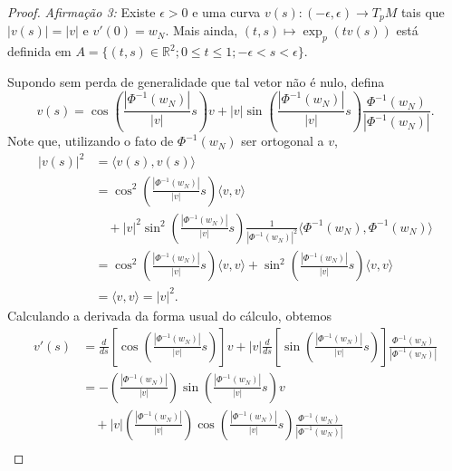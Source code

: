 \begin{theorem}
\begin{proof}
        \emph{Afirmação 3:} Existe $\epsilon>0$ e uma curva $v(s):(-\epsilon,\epsilon)\to T_{p}M$ tais que $|v(s)|=|v|$ e $v'(0)=w_{N}$. Mais ainda, $(t,s) \mapsto \exp_{p}(tv(s))$ está definida em $A=\{ (t,s) \in \mathbb{R}^{2}; 0\leq t\leq1; -\epsilon<s<\epsilon \}$.

        Supondo sem perda de generalidade que tal vetor não é nulo, defina
        \begin{equation*}
            v(s)=\cos\left( \frac{|\Phi ^{-1}(w_{N})|}{|v|}s \right)v+|v|\sin\left( \frac{|\Phi ^{-1}(w_{N})|}{|v|}s \right)\frac{\Phi ^{-1}(w_{N})}{|\Phi ^{-1}(w_{N})|}.
        \end{equation*}
        Note que, utilizando o fato de $\Phi ^{-1}(w_{N})$ ser ortogonal a $v$,
        \begin{align*}
            |v(s)|^{2} & =\langle v(s),v(s) \rangle                                                                                                                                 \\
                       & =\cos ^{2}\left(\frac{|\Phi ^{-1}(w_{N})|}{|v|}s \right)\langle v,v \rangle                                                                                \\
                       & \quad + |v|^{2}\sin^{2}\left( \frac{|\Phi ^{-1}(w_{N})|}{|v|}s \right)\frac{1}{|\Phi ^{-1}(w_{N})|^{2}}\langle \Phi ^{-1}(w_{N}), \Phi ^{-1}(w_{N})\rangle \\
                       & =\cos ^{2}\left(\frac{|\Phi ^{-1}(w_{N})|}{|v|}s \right)\langle v,v \rangle + \sin^{2}\left( \frac{|\Phi ^{-1}(w_{N})|}{|v|}s \right)\langle v,v \rangle   \\
                       & = \langle v,v \rangle =|v|^{2} .
        \end{align*}
        Calculando a derivada da forma usual do cálculo, obtemos
        \begin{align*}
            v'(s) & = \frac{d}{ds} \left[ \cos\left( \frac{|\Phi ^{-1}(w_N)|}{|v|}s \right) \right] v + |v| \frac{d}{ds} \left[ \sin\left( \frac{|\Phi ^{-1}(w_N)|}{|v|}s \right) \right] \frac{\Phi ^{-1}(w_N)}{|\Phi ^{-1}(w_N)|} \\
                  & = -\left( \frac{|\Phi ^{-1}(w_N)|}{|v|} \right) \sin\left( \frac{|\Phi ^{-1}(w_N)|}{|v|}s \right) v                                                                                                             \\
                  & \quad + |v| \left( \frac{|\Phi ^{-1}(w_N)|}{|v|} \right) \cos\left( \frac{|\Phi ^{-1}(w_N)|}{|v|}s \right) \frac{\Phi ^{-1}(w_N)}{|\Phi ^{-1}(w_N)|}                                                            \\

\end{align*}
\end{proof}
\end{theorem}
